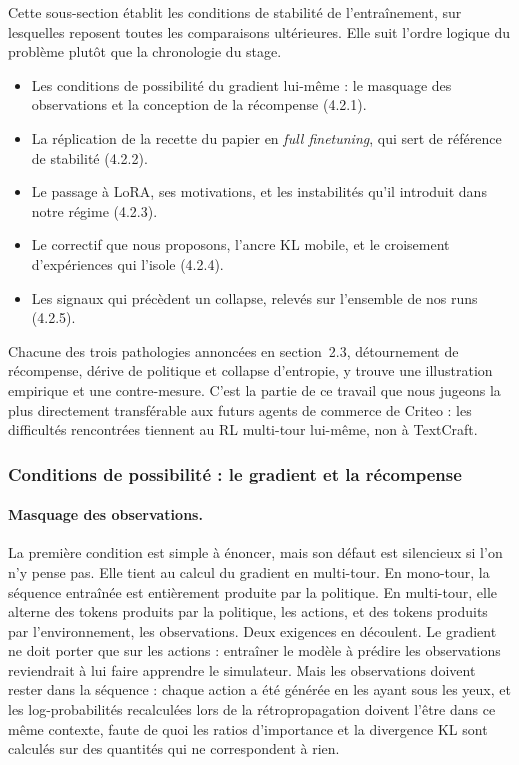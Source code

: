 \documentclass[11pt,a4paper]{article}
\begin{document}
Cette sous-section établit les conditions de stabilité de l'entraînement, sur lesquelles reposent toutes les comparaisons ultérieures. Elle suit l'ordre logique du problème plutôt que la chronologie du stage.

\begin{itemize}
    \item Les conditions de possibilité du gradient lui-même : le masquage des observations et la conception de la récompense (4.2.1).
    \item La réplication de la recette du papier en \emph{full finetuning}, qui sert de référence de stabilité (4.2.2).
    \item Le passage à LoRA, ses motivations, et les instabilités qu'il introduit dans notre régime (4.2.3).
    \item Le correctif que nous proposons, l'ancre KL mobile, et le croisement d'expériences qui l'isole (4.2.4).
    \item Les signaux qui précèdent un collapse, relevés sur l'ensemble de nos runs (4.2.5).
\end{itemize}

Chacune des trois pathologies annoncées en section~2.3, détournement de récompense, dérive de politique et collapse d'entropie, y trouve une illustration empirique et une contre-mesure. C'est la partie de ce travail que nous jugeons la plus directement transférable aux futurs agents de commerce de Criteo : les difficultés rencontrées tiennent au RL multi-tour lui-même, non à TextCraft.

\subsubsection{Conditions de possibilité : le gradient et la récompense}

\paragraph{Masquage des observations.} La première condition est simple à énoncer, mais son défaut est silencieux si l'on n'y pense pas. Elle tient au calcul du gradient en multi-tour. En mono-tour, la séquence entraînée est entièrement produite par la politique. En multi-tour, elle alterne des tokens produits par la politique, les actions, et des tokens produits par l'environnement, les observations. Deux exigences en découlent. Le gradient ne doit porter que sur les actions : entraîner le modèle à prédire les observations reviendrait à lui faire apprendre le simulateur. Mais les observations doivent rester dans la séquence : chaque action a été générée en les ayant sous les yeux, et les log-probabilités recalculées lors de la rétropropagation doivent l'être dans ce même contexte, faute de quoi les ratios d'importance et la divergence KL sont calculés sur des quantités qui ne correspondent à rien.
\end{document}
